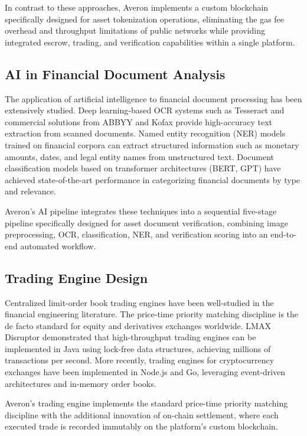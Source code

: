 \documentclass[conference]{IEEEtran}
\begin{document}
In contrast to these approaches, Averon implements a custom blockchain specifically designed for asset tokenization operations, eliminating the gas fee overhead and throughput limitations of public networks while providing integrated escrow, trading, and verification capabilities within a single platform.

\subsection{AI in Financial Document Analysis}

The application of artificial intelligence to financial document processing has been extensively studied. Deep learning-based OCR systems such as Tesseract \cite{ref6} and commercial solutions from ABBYY and Kofax provide high-accuracy text extraction from scanned documents. Named entity recognition (NER) models trained on financial corpora \cite{ref7} can extract structured information such as monetary amounts, dates, and legal entity names from unstructured text. Document classification models \cite{ref8} based on transformer architectures (BERT, GPT) have achieved state-of-the-art performance in categorizing financial documents by type and relevance.

Averon's AI pipeline integrates these techniques into a sequential five-stage pipeline specifically designed for asset document verification, combining image preprocessing, OCR, classification, NER, and verification scoring into an end-to-end automated workflow.

\subsection{Trading Engine Design}

Centralized limit-order book trading engines have been well-studied in the financial engineering literature. The price-time priority matching discipline \cite{ref9} is the de facto standard for equity and derivatives exchanges worldwide. LMAX Disruptor \cite{ref10} demonstrated that high-throughput trading engines can be implemented in Java using lock-free data structures, achieving millions of transactions per second. More recently, trading engines for cryptocurrency exchanges \cite{ref11} have been implemented in Node.js and Go, leveraging event-driven architectures and in-memory order books.

Averon's trading engine implements the standard price-time priority matching discipline with the additional innovation of on-chain settlement, where each executed trade is recorded immutably on the platform's custom blockchain.
\end{document}
